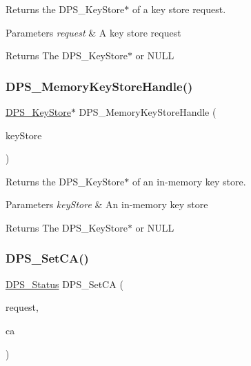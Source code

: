 Returns the {\ttfamily D\+P\+S\+\_\+\+Key\+Store$\ast$} of a key store request. 


\begin{DoxyParams}{Parameters}
{\em request} & A key store request\\
\hline
\end{DoxyParams}
\begin{DoxyReturn}{Returns}
The D\+P\+S\+\_\+\+Key\+Store$\ast$ or N\+U\+LL 
\end{DoxyReturn}
\mbox{\label{group__keystore_ga2811c4ffff51bd75a72dd0a9c8796616}} 
\subsubsection{\texorpdfstring{D\+P\+S\+\_\+\+Memory\+Key\+Store\+Handle()}{DPS\_MemoryKeyStoreHandle()}}
{\footnotesize\ttfamily \hyperlink{group__keystore_gaf3833cfe48f848f698514bc5daa075fa}{D\+P\+S\+\_\+\+Key\+Store}$\ast$ D\+P\+S\+\_\+\+Memory\+Key\+Store\+Handle (\begin{DoxyParamCaption}\item[{\hyperlink{group__keystore_ga57f11410b3ef6a686594b60836dc8c99}{D\+P\+S\+\_\+\+Memory\+Key\+Store} $\ast$}]{key\+Store }\end{DoxyParamCaption})}



Returns the {\ttfamily D\+P\+S\+\_\+\+Key\+Store$\ast$} of an in-\/memory key store. 


\begin{DoxyParams}{Parameters}
{\em key\+Store} & An in-\/memory key store\\
\hline
\end{DoxyParams}
\begin{DoxyReturn}{Returns}
The D\+P\+S\+\_\+\+Key\+Store$\ast$ or N\+U\+LL 
\end{DoxyReturn}
\mbox{\label{group__keystore_ga37595f3207e42c52f7006659399135b2}} 
\subsubsection{\texorpdfstring{D\+P\+S\+\_\+\+Set\+C\+A()}{DPS\_SetCA()}}
{\footnotesize\ttfamily \hyperlink{group__status_ga30395a84d3cad9d4ec29848106415038}{D\+P\+S\+\_\+\+Status} D\+P\+S\+\_\+\+Set\+CA (\begin{DoxyParamCaption}\item[{\hyperlink{group__keystore_ga7c3e50965b65334e9791780fa855ed16}{D\+P\+S\+\_\+\+Key\+Store\+Request} $\ast$}]{request,  }\item[{const char $\ast$}]{ca }\end{DoxyParamCaption})}



